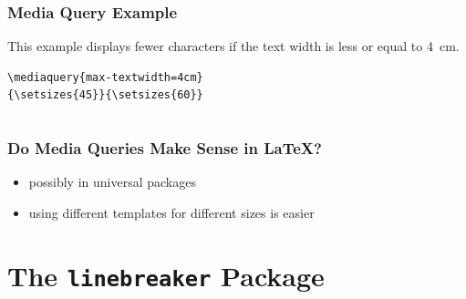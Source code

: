 \begin{frame}[fragile]

  \frametitle{Media Query Example}

  This example displays fewer characters if the text width is less or equal to 4~cm.

\begin{verbatim}
\mediaquery{max-textwidth=4cm}
{\setsizes{45}}{\setsizes{60}}
\end{verbatim}
\begin{columns}
  \begin{column}{0.5\textwidth}

\end{column}
  \begin{column}{0.5\textwidth}

\end{column}
\end{columns}

\end{frame}

\begin{frame}
  \frametitle{Do Media Queries Make Sense in \LaTeX?}
  \begin{itemize}
    \item possibly in universal packages
    \item using different templates for different sizes is easier
  \end{itemize}
\end{frame}

\section{The \texttt{linebreaker} Package}


\newcommand\testbox[1]{%
  \parbox{150pt}{%
    \parindent=15pt%
    \tolerance=1%
    \pretolerance=1%
    #1
  }%
}

\newcommand\printtest[1]{%
  \linebreakerdisable%
  \noindent\testbox{%
    #1
    \par\medskip\noindent\hfill\textbf{Without Linebreaker}\hfill\null
  }%
  \linebreakerenable%
  \hfill%
  \testbox{%
    #1
    \par\medskip\noindent\hfill\textbf{With Linebreaker}\hfill\null
  }%
}

